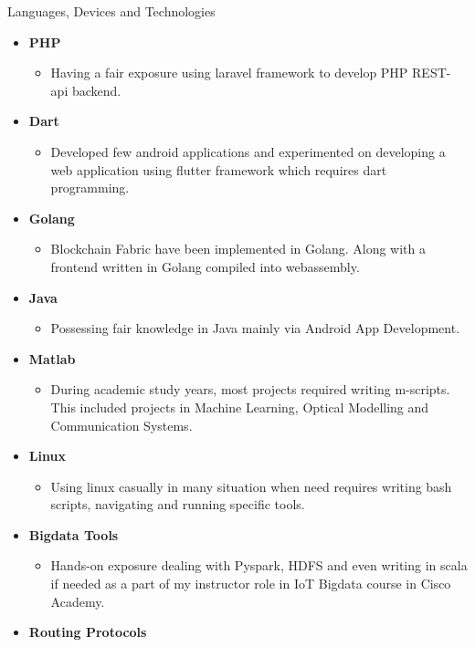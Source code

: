 \documentclass[]{mcdowellcv}
\begin{document}
\begin{cvsection}{Languages, Devices and Technologies}
\begin{cvsubsection}{}{}{}
\begin{itemize}
			
				\item \textbf{PHP}
				\begin{itemize}
					\item Having a fair exposure using laravel framework to develop PHP REST-api backend.
				\end{itemize}
				\item \textbf{Dart}
				\begin{itemize}
					\item Developed few android applications and experimented on developing a web application using flutter framework which requires dart programming.
				\end{itemize}
				\item \textbf{Golang}
				\begin{itemize}
					\item Blockchain Fabric have been implemented in Golang. Along with a frontend written in Golang compiled into webassembly.
				\end{itemize}
				\item \textbf{Java}
				\begin{itemize}
					\item Possessing fair knowledge in Java mainly via Android App Development.
				\end{itemize}
				\item \textbf{Matlab}
				\begin{itemize}
					\item During academic study years, most projects required writing m-scripts. This included projects in Machine Learning, Optical Modelling and Communication Systems.
				\end{itemize}
				\item \textbf{Linux}
				\begin{itemize}
					\item Using linux casually in many situation when need requires writing bash scripts, navigating and running specific tools. 
				\end{itemize}
				\item \textbf{Bigdata Tools}
				\begin{itemize}
					\item Hands-on exposure dealing with Pyspark, HDFS and even writing in scala if needed as a part of my instructor role in IoT Bigdata course in Cisco Academy.
				\end{itemize}
				\item \textbf{Routing Protocols}
				\begin{itemize}

\end{itemize}
\end{itemize}
\end{cvsubsection}
\end{cvsection}
\end{document}
